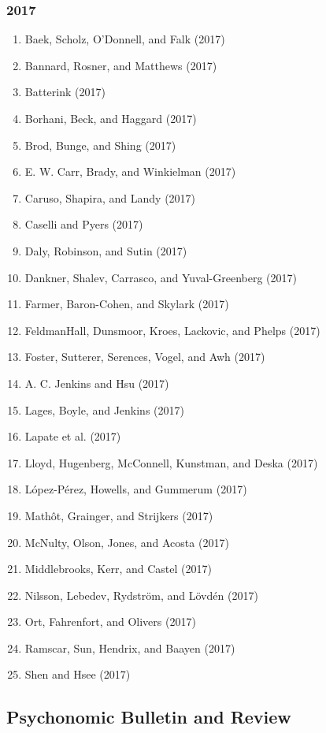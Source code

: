 \documentclass[english,man]{apa6}
\providecommand{\tightlist}{%
  \setlength{\itemsep}{0pt}\setlength{\parskip}{0pt}}
\theoremstyle{definition}
\theoremstyle{definition}
\theoremstyle{definition}
\theoremstyle{remark}
\begin{document}
\subsubsection{2017}\label{section-43}

\begin{enumerate}
\def\labelenumi{\arabic{enumi})}
\tightlist
\item
  Baek, Scholz, O'Donnell, and Falk (2017)
\item
  Bannard, Rosner, and Matthews (2017)
\item
  Batterink (2017)
\item
  Borhani, Beck, and Haggard (2017)
\item
  Brod, Bunge, and Shing (2017)
\item
  E. W. Carr, Brady, and Winkielman (2017)
\item
  Caruso, Shapira, and Landy (2017)
\item
  Caselli and Pyers (2017)
\item
  Daly, Robinson, and Sutin (2017)
\item
  Dankner, Shalev, Carrasco, and Yuval-Greenberg (2017)
\item
  Farmer, Baron-Cohen, and Skylark (2017)
\item
  FeldmanHall, Dunsmoor, Kroes, Lackovic, and Phelps (2017)
\item
  Foster, Sutterer, Serences, Vogel, and Awh (2017)
\item
  A. C. Jenkins and Hsu (2017)
\item
  Lages, Boyle, and Jenkins (2017)
\item
  Lapate et al. (2017)
\item
  Lloyd, Hugenberg, McConnell, Kunstman, and Deska (2017)
\item
  López-Pérez, Howells, and Gummerum (2017)
\item
  Mathôt, Grainger, and Strijkers (2017)
\item
  McNulty, Olson, Jones, and Acosta (2017)
\item
  Middlebrooks, Kerr, and Castel (2017)
\item
  Nilsson, Lebedev, Rydström, and Lövdén (2017)
\item
  Ort, Fahrenfort, and Olivers (2017)
\item
  Ramscar, Sun, Hendrix, and Baayen (2017)
\item
  Shen and Hsee (2017)
\end{enumerate}

\subsection{Psychonomic Bulletin and
Review}\label{psychonomic-bulletin-and-review}
\end{document}
